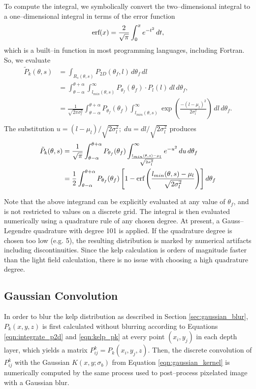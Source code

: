 To compute the integral, we symbolically convert the two--dimensional integral to a one--dimensional integral in terms of the error function
\begin{equation}
  \mbox{erf}(x) = \frac{2}{\sqrt{\pi}} \int_0^x e^{-t^2}\, dt,
\end{equation}
which is a built--in function in most programming languages, including Fortran.
So, we evaluate
\begin{align*}
	\tilde{P}_k(\theta, s) &= \int_{R_s(\theta,s)}P_{2D}(\theta_f,l)\, d\theta_f\, dl \\
  &= \int_{\theta-\alpha}^{\theta+\alpha}
  \int_{l_{min}(\theta,s)}^{\infty}
  P_{\theta_f}(\theta_f) \cdot P_l(l)
  \, dl\, d\theta_f, \\
  &= \frac{1}{\sqrt{2\pi\sigma_l^2}}
  \int_{\theta-\alpha}^{\theta+\alpha}
  P_{\theta_f}(\theta_f)
  \int_{l_{min}(\theta,s)}^{\infty}
  \exp\left(\frac{-(l-\mu_l)^2}{2\sigma_l^2}\right)
  \, dl\, d\theta_f. \\
\end{align*}
The substitution $u=(l-\mu_l)/\sqrt{2\sigma_l^2};\; du=dl/\sqrt{2\sigma_l^2}$ produces
\begin{align*}
  \tilde{P}_k(\theta, s)
  &= \frac{1}{\sqrt{\pi}}
  \int_{\theta-\alpha}^{\theta+\alpha}
  P_{\theta_f}(\theta_f)
  \int_{\frac{l_{min}(\theta,s)-\mu_l}{\sqrt{2\sigma_l^2}}}^{\infty}
  e^{-u^{2}}\, du
  \, d\theta_f \\
  &= \frac{1}{2}
  \int_{\theta-\alpha}^{\theta+\alpha}
  P_{\theta_f}(\theta_f)
  \left[1 - \mbox{erf}\left(\frac{l_{min}(\theta,s)-\mu_l}{\sqrt{2\sigma_l^2}}\right)\right]
  d\theta_f
\end{align*}

Note that the above integrand can be explicitly evaluated at any value of $\theta_f$, and is not restricted to values on a discrete grid.
The integral is then evaluated numerically using a quadrature rule of any chosen degree.
At present, a Gauss--Legendre quadrature with degree 101 is applied.
If the quadrature degree is chosen too low (e.g. 5), the resulting distribution is marked by numerical artifacts including discontinuities.
Since the kelp calculation is orders of magnitude faster than the light field calculation, there is no issue with choosing a high quadrature degree.

\subsection{Gaussian Convolution}
In order to blur the kelp distribution as described in Section \ref{sec:gaussian_blur}, $P_k(x, y, z)$ is first calculated without blurring according to Equations \eqref{eqn:integrate_p2d} and \eqref{eqn:kelp_pk} at every point $(x_i, y_j)$ in each depth layer, which yields a matrix $P_{ij}^k = P_k(x_i, y_j, z)$.
Then, the discrete convolution of $P_{ij}^k$ with the Gaussian $K(x, y; \sigma_b)$ from Equation \eqref{eqn:gaussian_kernel} is numerically computed by the same process used to post--process pixelated image with a Gaussian blur.

